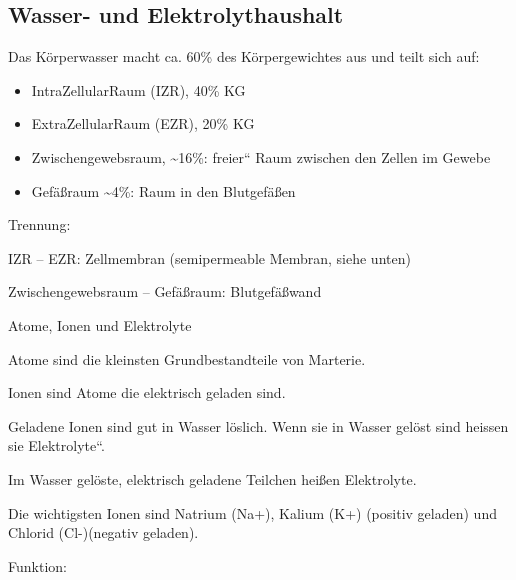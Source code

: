 \documentclass{article}
\begin{document}
\subsection[Wasser- und Elektro\-lyt\-haus\-halt]{%
%
Wasser- und Elektro\-lyt\-haus\-halt}
Das K\"orperwasser macht ca. 60\% des K\"orpergewichtes aus und teilt
sich auf:

\begin{itemize}
\item IntraZellularRaum (IZR), 40\% KG 

\item ExtraZellularRaum (EZR), 20\% KG 

\end{itemize}
\begin{itemize}
\item {}Zwischengewebsraum, \~{}16\%:
{\quotedblbase}freier{\textquotedblleft} Raum zwischen den Zellen im
Gewebe

\item {}Gef\"a{\ss}raum \~{}4\%: Raum in den
Blutgef\"a{\ss}en

\end{itemize}
Trennung: 

IZR -- EZR:    Zellmembran (semipermeable Membran, siehe unten)

Zwischengewebsraum -- Gef\"a{\ss}raum:  Blutgef\"a{\ss}wand

Atome, Ionen und
Elektrolyte 

Atome sind die kleinsten Grundbestandteile von Marterie.

Ionen sind Atome die elektrisch geladen sind.

Geladene Ionen sind gut in Wasser l\"oslich. Wenn sie in Wasser gel\"ost
sind heissen sie {\quotedblbase}Elektrolyte{\textquotedblleft}. 

Im Wasser gel\"oste, elektrisch geladene Teilchen hei{\ss}en
Elektrolyte.

Die wichtigsten Ionen sind Natrium (Na+), Kalium (K+) (positiv geladen)
und Chlorid (Cl-)(negativ geladen). 

Funktion:
\end{document}
